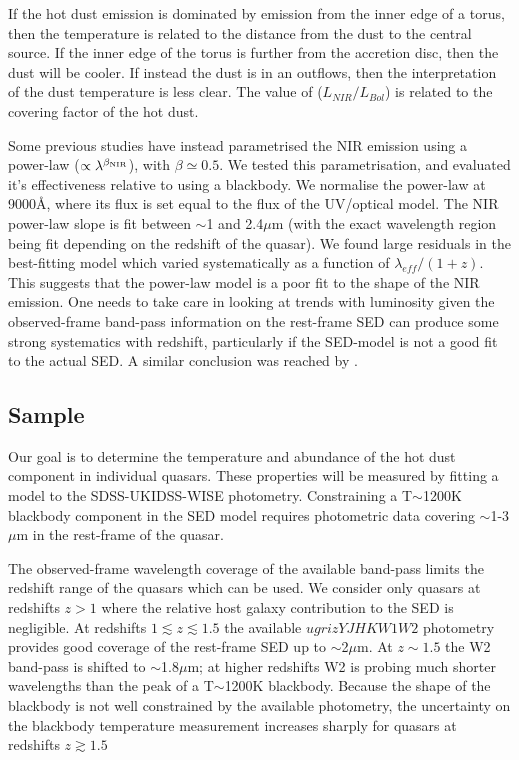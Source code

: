 If the hot dust emission is dominated by emission from the inner edge of a torus, then the temperature is related to the distance from the dust to the central source. 
If the inner edge of the torus is further from the accretion disc, then the dust will be cooler.
If instead the dust is in an outflows, then the interpretation of the dust temperature is less clear.  
The value of ($L_{NIR}/L_{Bol}$) is related to the covering factor of the hot dust. 

Some previous studies \citep[e.g.][]{wang13,zhang14} have instead parametrised the NIR emission using a power-law ($\propto \lambda^{\beta_{\rm NIR}}$), with $\beta \simeq 0.5$. 
We tested this parametrisation, and evaluated it's effectiveness relative to using a blackbody. 
We normalise the power-law at 9000\AA, where its flux is set equal to the flux of the UV/optical model. 
The NIR power-law slope is fit between $\sim$1 and 2.4$\mu$m (with the exact wavelength region being fit depending on the redshift of the quasar). 
We found large residuals in the best-fitting model which varied systematically as a function of $\lambda_{eff}/(1+z)$.  
This suggests that the power-law model is a poor fit to the shape of the NIR emission. 
One needs to take care in looking at trends with luminosity given the observed-frame band-pass information on the rest-frame SED can produce some strong systematics with redshift, particularly if the SED-model is not a good fit to the actual SED. 
A similar conclusion was reached by \citet{gallagher07}.

\subsection{Sample}

Our goal is to determine the temperature and abundance of the hot dust component in individual quasars.  
These properties will be measured by fitting a model to the SDSS-UKIDSS-WISE photometry. 
Constraining a T$\sim$1200K blackbody component in the SED model requires photometric data covering $\sim$1-3$\mu$m in the rest-frame of the quasar. 

The observed-frame wavelength coverage of the available band-pass limits the redshift range of the quasars which can be used. 
We consider only quasars at redshifts $z>1$ where the relative host galaxy contribution to the SED is negligible. 
At redshifts $1 \lesssim z \lesssim 1.5$ the available $ugrizYJHKW1W2$ photometry provides good coverage of the rest-frame SED up to $\sim$2$\mu$m.
At $z\sim1.5$ the W2 band-pass is shifted to $\sim$1.8$\mu$m; at higher redshifts W2 is probing much shorter wavelengths than the peak of a T$\sim$1200K blackbody. 
Because the shape of the blackbody is not well constrained by the available photometry, the uncertainty on the blackbody temperature measurement increases sharply for quasars at redshifts $z\gtrsim1.5$ 

